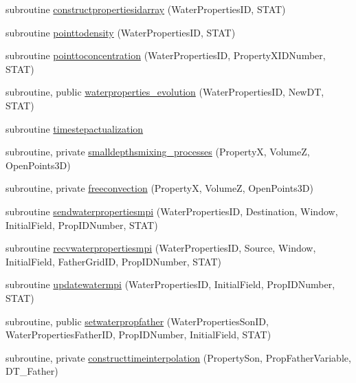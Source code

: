\begin{DoxyCompactItemize}
\item 
subroutine \mbox{\hyperlink{namespacemodulewaterproperties_aa292f8dd2fd9a4ac03ea1234db030644}{constructpropertiesidarray}} (Water\+Properties\+ID, S\+T\+AT)
\item 
subroutine \mbox{\hyperlink{namespacemodulewaterproperties_a4585c55e4791aa9e486553e2e0ad3c5c}{pointtodensity}} (Water\+Properties\+ID, S\+T\+AT)
\item 
subroutine \mbox{\hyperlink{namespacemodulewaterproperties_a4a3c2baf1d479b6f25201db3550c7a46}{pointtoconcentration}} (Water\+Properties\+ID, Property\+X\+I\+D\+Number, S\+T\+AT)
\item 
subroutine, public \mbox{\hyperlink{namespacemodulewaterproperties_aa86f63313e6563018f6b05938306a23d}{waterproperties\+\_\+evolution}} (Water\+Properties\+ID, New\+DT, S\+T\+AT)
\item 
subroutine \mbox{\hyperlink{namespacemodulewaterproperties_a96402f50a619ea1b6477bb32d13a9020}{timestepactualization}}
\item 
subroutine, private \mbox{\hyperlink{namespacemodulewaterproperties_ad38f0837c272b87901bd3963788eb9e9}{smalldepthsmixing\+\_\+processes}} (PropertyX, VolumeZ, Open\+Points3D)
\item 
subroutine, private \mbox{\hyperlink{namespacemodulewaterproperties_a2ac3ef009338f33bfef1ccc910ccf6d7}{freeconvection}} (PropertyX, VolumeZ, Open\+Points3D)
\item 
subroutine \mbox{\hyperlink{namespacemodulewaterproperties_a06e60ba3cd186c1e0cc2c534f1148b41}{sendwaterpropertiesmpi}} (Water\+Properties\+ID, Destination, Window, Initial\+Field, Prop\+I\+D\+Number, S\+T\+AT)
\item 
subroutine \mbox{\hyperlink{namespacemodulewaterproperties_ae6984c00ccf20f1bc66a14e9e9466c38}{recvwaterpropertiesmpi}} (Water\+Properties\+ID, Source, Window, Initial\+Field, Father\+Grid\+ID, Prop\+I\+D\+Number, S\+T\+AT)
\item 
subroutine \mbox{\hyperlink{namespacemodulewaterproperties_a12cedfb20b7e67e1de82bb36c9375e95}{updatewatermpi}} (Water\+Properties\+ID, Initial\+Field, Prop\+I\+D\+Number, S\+T\+AT)
\item 
subroutine, public \mbox{\hyperlink{namespacemodulewaterproperties_abab3678d93906f85e9e8392ced1e6ab4}{setwaterpropfather}} (Water\+Properties\+Son\+ID, Water\+Properties\+Father\+ID, Prop\+I\+D\+Number, Initial\+Field, S\+T\+AT)
\item 
subroutine, private \mbox{\hyperlink{namespacemodulewaterproperties_affcb95213dcebf7b3e1fe53b349d50b6}{constructtimeinterpolation}} (Property\+Son, Prop\+Father\+Variable, D\+T\+\_\+\+Father)

\end{DoxyCompactItemize}
